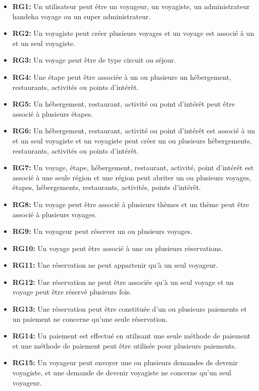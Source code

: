 \documentclass[12pt]{report}
\begin{document}
			\begin{itemize}
			    \item \textbf{RG1:} Un utilisateur peut être un voyageur, un voyagiste, un administrateur handeha voyage ou un super administrateur.
			    \item \textbf{RG2:} Un voyagiste peut créer plusieurs voyages et un voyage est associé à un et un seul voyagiste.
			    \item \textbf{RG3:} Un voyage peut être de type circuit ou séjour.
			    \item \textbf{RG4:} Une étape peut être associée à un ou plusieurs un hébergement, restaurants, activités ou points d'intérêt.
			    \item \textbf{RG5:} Un hébergement, restaurant, activité ou point d'intérêt peut être associé à plusieurs étapes.
			    \item \textbf{RG6:} Un hébergement, restaurant, activité ou point d'intérêt est associé à un et un seul voyagiste et un voyagiste peut créer un ou plusieurs hébergements, restaurants, activités ou points d'intérêt.
			    \item \textbf{RG7:} Un voyage, étape, hébergement, restaurant, activité, point d'intérêt est associé à une seule région et une région peut abriter un ou plusieurs voyages, étapes, hébergements, restaurants, activités, points d'intérêt.
			    \item \textbf{RG8:} Un voyage peut être associé à plusieurs thèmes et un thème peut être associé à plusieurs voyages.
			    \item \textbf{RG9:} Un voyageur peut réserver un ou plusieurs voyages.
			    \item \textbf{RG10:} Un voyage peut être associé à une ou plusieurs réservations.
			    \item \textbf{RG11:} Une réservation ne peut appartenir qu'à un seul voyageur.
			    \item \textbf{RG12:} Une réservation ne peut être associée qu'à un seul voyage et un voyage peut être réservé plusieurs fois.
			    \item \textbf{RG13:} Une réservation peut être constituée d'un ou plusieurs paiements et un paiement ne concerne qu'une seule réservation.
			    \item \textbf{RG14:} Un paiement est effectué en utilisant une seule méthode de paiement et une méthode de paiement peut être utilisée pour plusieurs paiements.
			    \item \textbf{RG15:} Un voyageur peut envoyer une ou plusieurs demandes de devenir voyagiste, et une demande de devenir voyagiste ne concerne qu'un seul voyageur.

\end{itemize}
\end{document}
